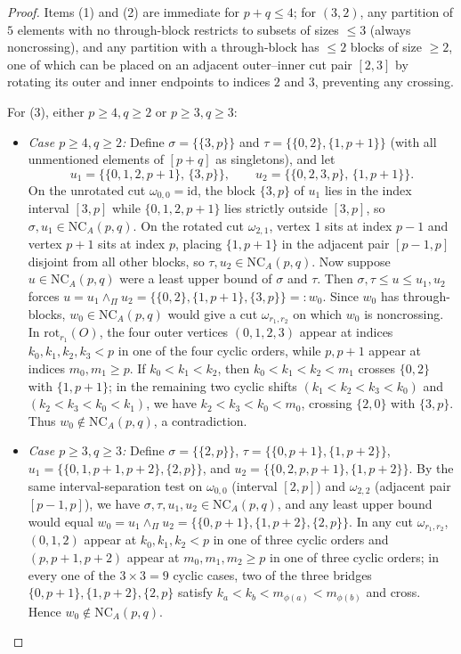 \documentclass[11pt]{article}
\theoremstyle{definition}
\newcommand{\NCA}{\mathrm{NC}_A}
\begin{document}
\begin{proof}
Items (1) and (2) are immediate for $p+q \le 4$; for $(3,2)$, any partition of $5$ elements with no through-block restricts to subsets of sizes $\le 3$ (always noncrossing), and any partition with a through-block has $\le 2$ blocks of size $\ge 2$, one of which can be placed on an adjacent outer--inner cut pair $[2,3]$ by rotating its outer and inner endpoints to indices $2$ and $3$, preventing any crossing.

For (3), either $p \ge 4, q \ge 2$ or $p \ge 3, q \ge 3$:
\begin{itemize}
  \item \emph{Case $p \ge 4, q \ge 2$:} Define $\sigma = \{\{3, p\}\}$ and $\tau = \{\{0, 2\}, \{1, p+1\}\}$ (with all unmentioned elements of $[p+q]$ as singletons), and let
  \[
    u_1 = \bigl\{\{0, 1, 2, p+1\},\, \{3, p\}\bigr\}, \qquad u_2 = \bigl\{\{0, 2, 3, p\},\, \{1, p+1\}\bigr\}.
  \]
  On the unrotated cut $\omega_{0,0} = \mathrm{id}$, the block $\{3, p\}$ of $u_1$ lies in the index interval $[3, p]$ while $\{0, 1, 2, p+1\}$ lies strictly outside $[3, p]$, so $\sigma, u_1 \in \NCA(p,q)$. On the rotated cut $\omega_{2,1}$, vertex $1$ sits at index $p-1$ and vertex $p+1$ sits at index $p$, placing $\{1, p+1\}$ in the adjacent pair $[p-1, p]$ disjoint from all other blocks, so $\tau, u_2 \in \NCA(p,q)$. Now suppose $u \in \NCA(p,q)$ were a least upper bound of $\sigma$ and $\tau$. Then $\sigma, \tau \le u \le u_1, u_2$ forces $u = u_1 \wedge_\Pi u_2 = \{\{0,2\}, \{1,p+1\}, \{3,p\}\} =: w_0$. Since $w_0$ has through-blocks, $w_0 \in \NCA(p,q)$ would give a cut $\omega_{r_1,r_2}$ on which $w_0$ is noncrossing. In $\mathrm{rot}_{r_1}(O)$, the four outer vertices $(0,1,2,3)$ appear at indices $k_0, k_1, k_2, k_3 < p$ in one of the four cyclic orders, while $p, p+1$ appear at indices $m_0, m_1 \ge p$. If $k_0 < k_1 < k_2$, then $k_0 < k_1 < k_2 < m_1$ crosses $\{0,2\}$ with $\{1,p+1\}$; in the remaining two cyclic shifts $(k_1 < k_2 < k_3 < k_0)$ and $(k_2 < k_3 < k_0 < k_1)$, we have $k_2 < k_3 < k_0 < m_0$, crossing $\{2,0\}$ with $\{3,p\}$. Thus $w_0 \notin \NCA(p,q)$, a contradiction.
  \item \emph{Case $p \ge 3, q \ge 3$:} Define $\sigma = \{\{2, p\}\}$, $\tau = \{\{0, p+1\}, \{1, p+2\}\}$, $u_1 = \{\{0, 1, p+1, p+2\}, \{2, p\}\}$, and $u_2 = \{\{0, 2, p, p+1\}, \{1, p+2\}\}$. By the same interval-separation test on $\omega_{0,0}$ (interval $[2,p]$) and $\omega_{2,2}$ (adjacent pair $[p-1, p]$), we have $\sigma, \tau, u_1, u_2 \in \NCA(p,q)$, and any least upper bound would equal $w_0 = u_1 \wedge_\Pi u_2 = \{\{0,p+1\}, \{1,p+2\}, \{2,p\}\}$. In any cut $\omega_{r_1,r_2}$, $(0,1,2)$ appear at $k_0, k_1, k_2 < p$ in one of three cyclic orders and $(p, p+1, p+2)$ appear at $m_0, m_1, m_2 \ge p$ in one of three cyclic orders; in every one of the $3 \times 3 = 9$ cyclic cases, two of the three bridges $\{0,p+1\}, \{1,p+2\}, \{2,p\}$ satisfy $k_a < k_b < m_{\phi(a)} < m_{\phi(b)}$ and cross. Hence $w_0 \notin \NCA(p,q)$.

\end{itemize}
\end{proof}
\end{document}
